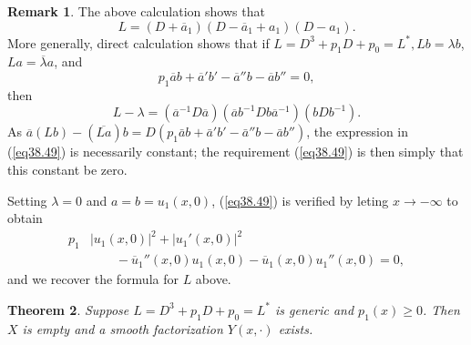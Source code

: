 \documentclass{surv-l}
\theoremstyle{plain}
\newtheorem{theorem}{Theorem}[section]
\theoremstyle{definition}
\newtheorem{remark}[theorem]{Remark}
\numberwithin{equation}{chapter}
\begin{document}
\begin{remark}\label{rem38.48} The above calculation shows that
\begin{equation*}
L=(D+\overline{a}_{1})(D-\overline{a}_{1}+a_{1})(D-a_{1}).
\end{equation*}
More generally, direct calculation shows that if $L=D^{3}+p_{1}D+p_{0}=L^{*},Lb=\lambda b$,
$La=\overline{\lambda}a$, and
\setcounter{equation}{48}
\begin{equation}\label{eq38.49}
p_{1}\overline{a}b+\overline{a}'b'-\overline{a}''b-\overline{a}b''=0,
\end{equation}
then
\begin{equation*}
L-\lambda=(\overline{a}^{-1}D\overline{a})(\overline{a}b^{-1}Db\overline{a}^{-1})(bDb^{-1}).
\end{equation*}
As $\overline{a}(Lb)-(\overline{La})b=D(p_{1}\bar{a}b+\bar{a}'b'-\bar{a}''b-\bar{a}b'')$, the expression in (\ref{eq38.49}) is necessarily constant; the requirement (\ref{eq38.49}) is then simply that this constant be zero.

Setting $\lambda=0$ and $a=b=u_{1}(x,0)$, (\ref{eq38.49}) is verified by leting $ x\rightarrow-\infty$ to obtain
\begin{align}\label{eq38.50}
p_{1}&|u_{1}(x, 0)|^{2}+|u_{1}'(x,0)|^{2}\\
&\qquad -\overline{u}_{1}''(x, 0)u_1(x,0)-\overline{u}_{1}(x, 0)u_{1}''(x, 0)=0,\nonumber
\end{align}
and we recover the formula for $L$ above.
\end{remark}
\setcounter{theorem}{50}
\begin{theorem}\label{thm38.51} Suppose $L=D^{3}+p_{1}D+p_{0}=L^{*}$ is generic and $ p_{1}(x)\geq 0$. Then $X$ is empty and a smooth factorization $Y(x,\cdot)$ exists.
\end{theorem}
\end{document}
